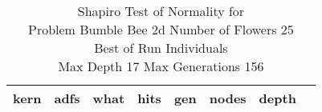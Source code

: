 \begin{table}[H]
\caption{Shapiro Test of Normality for \\ Problem  Bumble Bee 2d  Number of Flowers 25\\Best of Run Individuals \\ Max Depth 17 Max Generations 156\\}
\begin{center}
\scalebox{0.8} %
{
\begin{tabular}{lrrrrrrr}
\hline
kern & adfs & what & hits & gen & nodes & depth \\
\hline


\end{tabular}
}
\end{center}
\end{table}

